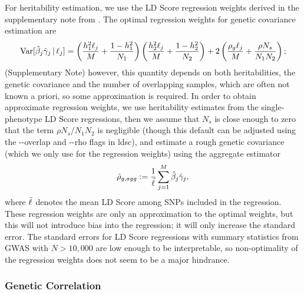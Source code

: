\documentclass[11pt]{article}
\begin{document}
For heritability estimation, we use the LD Score regression weights derived in the 
supplementary note from \cite{buliksullivan2014}. 
The optimal regression weights for genetic covariance estimation are 
$$ \mathrm{Var}[\hat{\beta}_j\hat{\gamma}_j \,|\, \ell_j ] = 
	\left( 
		\frac{h_{1}^2\ell_j}{M} 
		+ 
		\frac{1-h_{1}^2}{N_1} 
	\right) \left(  
		\frac{h_{2}^2\ell_j}{M} 
		+ 
		\frac{1-h_{2}^2}{N_2}
	\right) 
	+ 					
	2\left( 
		\frac{\rho_g\ell_j}{M} 
		+ 
		\frac{\rho N_s}{N_1N_2} 
	\right);
$$
(Supplementary Note) however, this quantity depends on both heritabilities, 
the genetic covariance and the number of overlapping samples,
which are often not known a priori, so some approximation is required.
In order to obtain approximate regression weights, 
we use heritability estimates from the single-phenotype LD Score regressions, then
we assume that $N_s$ is close enough to zero that the term $\rho N_s/N_1N_2$ is negligible
(though this default can be adjusted using the {-}{-}overlap and {-}{-}rho flags in ldsc),
and estimate a rough genetic covariance (which we only use for the regression weights)
using the aggregate estimator 
$$\hat{\rho}_{g, agg} := \frac{1}{\bar{\ell}}\sum_{j=1}^M \hat{\beta}_j\hat{\gamma}_j,$$
where $\bar{\ell}$ denotes the mean LD Score among SNPs included in the regression.
These regression weights are only an approximation to the optimal weights,
but this will not introduce bias into the regression;
it will only increase the standard error. 
The standard errors for LD Score regressions with summary statistics 
from GWAS with $N > 10,000$ are low enough to be interpretable,
so non-optimality of the regression weights does not seem to be a major hindrance.

\subsubsection{Genetic Correlation}
\end{document}
